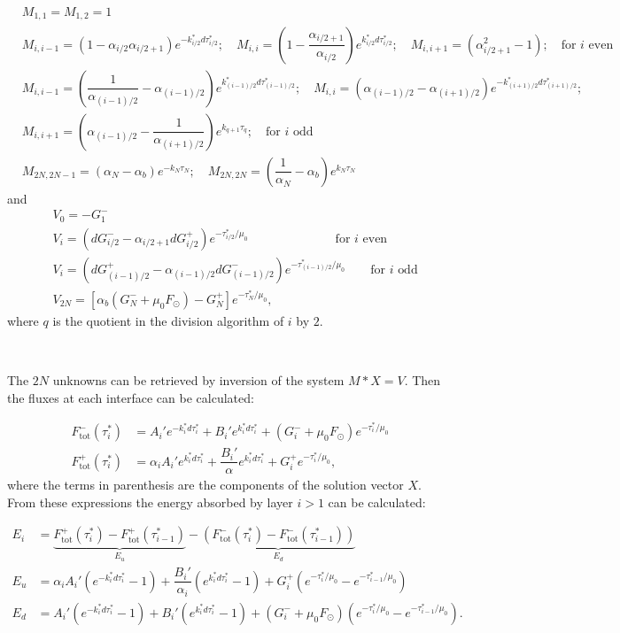 \documentclass[a4paper,11pt]{article}
\begin{document}
\begin{align*}
&M_{1,1}=M_{1,2}=1 \\
&M_{i,i-1}=(1-\alpha_{i/2} \alpha_{i/2+1})e^{-k_{i/2}^* d\tau_{i/2}^*};\quad M_{i,i}=(1-\dfrac{\alpha_{i/2+1}}{\alpha_{i/2}})e^{k_{i/2}^* d\tau_{i/2}^*};\quad M_{i,i+1}=(\alpha_{i/2+1}^2 -1); \quad \textrm{for $i$ even} \\
&M_{i,i-1}=(\dfrac{1}{\alpha_{(i-1)/2}}-\alpha_{(i-1)/2}) e^{k_{(i-1)/2}^* d\tau_{(i-1)/2}^*};\quad M_{i,i}=(\alpha_{(i-1)/2}-\alpha_{(i+1)/2})e^{-k_{(i+1)/2}^* d\tau_{(i+1)/2}^*}; \\
& M_{i,i+1}=(\alpha_{(i-1)/2}-\dfrac{1}{\alpha_{(i+1)/2}})e^{k_{q+1} \tau_q};  \quad \textrm{for $i$ odd} \\
&M_{2N,2N-1}=(\alpha_N-\alpha_b) e^{-k_N \tau_N} ; \quad M_{2N,2N}=(\dfrac{1}{\alpha_N}-\alpha_b) e^{k_N \tau_N}
\end{align*}
and
\begin{align*}
& V_0 =-G^-_1 \\
& V_i= (dG_{i/2}^{-}-\alpha_{i/2+1}dG_{i/2}^{+})e^{-\tau_{i/2}^*/\mu_0} \qquad \qquad \qquad \quad \textrm{for $i$ even} \\
& V_i=(dG_{(i-1)/2}^{+}-\alpha_{(i-1)/2}dG_{(i-1)/2}^{-})e^{-\tau_{(i-1)/2}^*/\mu_0} \quad \quad \textrm{for $i$ odd} \\
& V_{2N}=\left[\alpha_b(G_N^{-}+\mu_0 F_\odot)-G_{N}^{+}\right]e^{-\tau_{N}^*/\mu_0},
\end{align*}
where $q$ is the quotient in the division algorithm of $i$ by $2$.

\

The $2N$ unknowns can be retrieved by inversion of the system $M*X=V$. Then the fluxes at each interface can be calculated:

\begin{align}
F^{-}_{\textrm{tot}}(\tau_i^*) & =A_i'e^{-k_i^*d\tau_{i}^*}+B_i'e^{k_i^*d\tau_{i}^*} + (G_i^{-} + \mu_0 F_\odot)e^{-\tau^*_i/\mu_0} \\
F^{+}_{\textrm{tot}}(\tau^*_i) & =\alpha_i A_i' e^{k_i^* d\tau^*_{i}}+\dfrac{B_i'}{\alpha} e^{k_i^* d\tau^*_{i}}+G_i^{+}e^{-\tau^*_i /\mu_0},
\end{align}
where the terms in parenthesis are the components of the solution vector $X$. From these expressions the energy absorbed by layer $i>1$ can be calculated:

\begin{align}
E_i & =\underbrace{F^{+}_{\textrm{tot}}(\tau_{i}^*)-F^{+}_{\textrm{tot}}(\tau_{i-1}^*)}_{E_u}-\underbrace{\left(F^{-}_{\textrm{tot}}(\tau_{i}^*)-F^{-}_{\textrm{tot}}(\tau_{i-1}^*)\right)}_{E_d} \\
E_u & = \alpha_iA_i' (e^{-k_i^*d\tau_{i}^*}-1)+ \dfrac{B_i'}{\alpha_i}(e^{k_i^*d\tau_{i}^*}-1) + G_i^{+}(e^{-\tau^*_i/\mu_0}-e^{-\tau^*_{i-1}/\mu_0})\\
E_d & = A_i' (e^{-k_i^*d\tau_{i}^*}-1)+ B_i'(e^{k_i^*d\tau_{i}^*}-1) + (G_i^{-} + \mu_0 F_\odot)(e^{-\tau^*_i/\mu_0}-e^{-\tau^*_{i-1}/\mu_0}).
\end{align}
\end{document}
